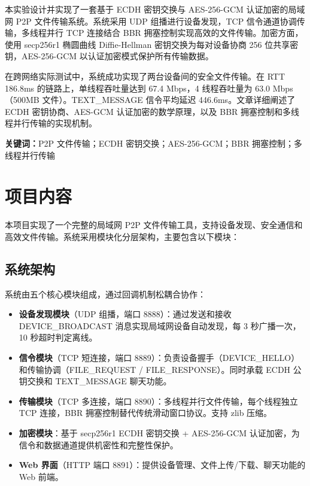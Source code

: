 \documentclass[12pt]{article}
\begin{document}
本实验设计并实现了一套基于 ECDH 密钥交换与 AES-256-GCM 认证加密的局域网 P2P 文件传输系统。系统采用 UDP 组播进行设备发现，TCP 信令通道协调传输，多线程并行 TCP 连接结合 BBR 拥塞控制实现高效的文件传输。加密方面，使用 secp256r1 椭圆曲线 Diffie-Hellman 密钥交换为每对设备协商 256 位共享密钥，AES-256-GCM 以认证加密模式保护所有传输数据。

在跨网络实际测试中，系统成功实现了两台设备间的安全文件传输。在 RTT 186.8ms 的链路上，单线程吞吐量达到 67.4 Mbps，4 线程吞吐量为 63.0 Mbps（500MB 文件）。TEXT\_MESSAGE 信令平均延迟 446.6ms。文章详细阐述了 ECDH 密钥协商、AES-GCM 认证加密的数学原理，以及 BBR 拥塞控制和多线程并行传输的实现机制。

\vspace{1em}
\noindent\textbf{关键词：}P2P 文件传输；ECDH 密钥交换；AES-256-GCM；BBR 拥塞控制；多线程并行传输

\section{项目内容}

本项目实现了一个完整的局域网 P2P 文件传输工具，支持设备发现、安全通信和高效文件传输。系统采用模块化分层架构，主要包含以下模块：

\subsection{系统架构}

系统由五个核心模块组成，通过回调机制松耦合协作：

\begin{itemize}
    \item \textbf{设备发现模块}（UDP 组播，端口 8888）：通过发送和接收 DEVICE\_BROADCAST 消息实现局域网设备自动发现，每 3 秒广播一次，10 秒超时判定离线。
    \item \textbf{信令模块}（TCP 短连接，端口 8889）：负责设备握手（DEVICE\_HELLO）和传输协调（FILE\_REQUEST / FILE\_RESPONSE）。同时承载 ECDH 公钥交换和 TEXT\_MESSAGE 聊天功能。
    \item \textbf{传输模块}（TCP 多连接，端口 8890）：多线程并行文件传输，每个线程独立 TCP 连接，BBR 拥塞控制替代传统滑动窗口协议。支持 zlib 压缩。
    \item \textbf{加密模块}：基于 secp256r1 ECDH 密钥交换 + AES-256-GCM 认证加密，为信令和数据通道提供机密性和完整性保护。
    \item \textbf{Web 界面}（HTTP 端口 8891）：提供设备管理、文件上传/下载、聊天功能的 Web 前端。
\end{itemize}
\end{document}
